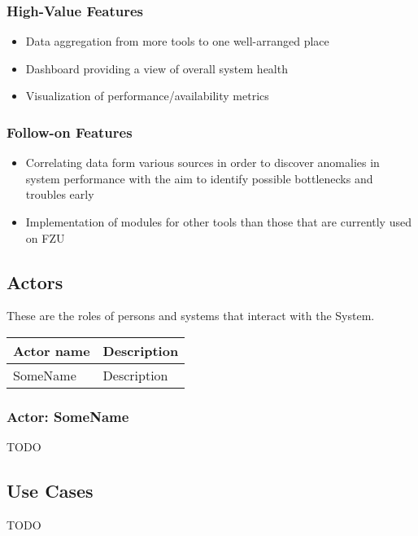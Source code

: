 \documentclass[12pt]{article}
\begin{document}
\subsubsection{High-Value Features}
\begin{itemize}
	\item Data aggregation from more tools to one well-arranged place
    \item Dashboard providing a view of overall system health
    \item Visualization of performance/availability metrics
\end{itemize}

\subsubsection{Follow-on Features}
\begin{itemize}
    \item Correlating data form various sources in order to discover anomalies
        in system performance with the aim to identify possible bottlenecks and
        troubles early
	\item Implementation of modules for other tools than those that are currently used on FZU
\end{itemize}

\subsection{Actors}
These are the roles of persons and systems that interact with the System.

\begin{table}[!h]
	\begin{tabular}{| l | l |}
		\hline
		\textbf{Actor name}		& \textbf{Description}\\
		\hline
		SomeName	& Description\\
		\hline
	\end{tabular}
	\label{tab:Actors}
\end{table}

\subsubsection{Actor: SomeName}
TODO

\subsection{Use Cases}

TODO
\end{document}
